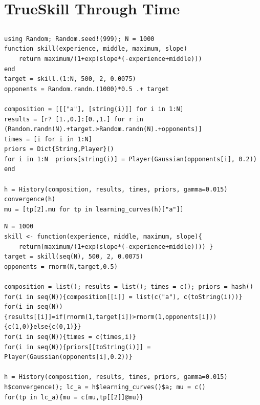 \documentclass[a4paper,11pt]{book}
\theoremstyle{definition}
\newif\ifen
\newif\ifes
\newcommand{\en}[1]{\ifen#1\fi}
\newcommand{\es}[1]{\ifes#1\fi}
\begin{document}
\section{TrueSkill Through Time}

\subsection{\en{Skill evolution}}\label{sec:appendix_skill_evolution}

\en{We attach the \texttt{Julia} and \texttt{R} codes that solve the example presented in the section \ref{sec:skill_evolution} about estimation the skill evolution of a new player. }%
\es{Adjuntamos los códigos de \texttt{Julia} y \texttt{R} que resuelven el ejemplo presentado en la sección \ref{sec:skill_evolution} sobre la evolución de habilidad de un jugador nuevo. }%
%
\begin{lstlisting}[backgroundcolor=\color{julia!60},caption={\en{\texttt{Julia} code}\es{Código \texttt{Julia}}},aboveskip=0.0 \baselineskip, belowskip=0.1cm]
using Random; Random.seed!(999); N = 1000
function skill(experience, middle, maximum, slope)
    return maximum/(1+exp(slope*(-experience+middle)))
end
target = skill.(1:N, 500, 2, 0.0075)
opponents = Random.randn.(1000)*0.5 .+ target

composition = [[["a"], [string(i)]] for i in 1:N]
results = [r? [1.,0.]:[0.,1.] for r in (Random.randn(N).+target.>Random.randn(N).+opponents)]
times = [i for i in 1:N]
priors = Dict{String,Player}()
for i in 1:N  priors[string(i)] = Player(Gaussian(opponents[i], 0.2))  end

h = History(composition, results, times, priors, gamma=0.015)
convergence(h)
mu = [tp[2].mu for tp in learning_curves(h)["a"]]
\end{lstlisting}
%
\begin{lstlisting}[backgroundcolor=\color{r!50},caption={\en{\texttt{R} code}\es{Código \texttt{R}}},aboveskip=0.0 \baselineskip, belowskip=0.1cm]
N = 1000
skill <- function(experience, middle, maximum, slope){
    return(maximum/(1+exp(slope*(-experience+middle)))) }
target = skill(seq(N), 500, 2, 0.0075)
opponents = rnorm(N,target,0.5)

composition = list(); results = list(); times = c(); priors = hash()
for(i in seq(N)){composition[[i]] = list(c("a"), c(toString(i)))}
for(i in seq(N)){results[[i]]=if(rnorm(1,target[i])>rnorm(1,opponents[i])){c(1,0)}else{c(0,1)}}
for(i in seq(N)){times = c(times,i)}
for(i in seq(N)){priors[[toString(i)]] = Player(Gaussian(opponents[i],0.2))}

h = History(composition, results, times, priors, gamma=0.015)
h$convergence(); lc_a = h$learning_curves()$a; mu = c()
for(tp in lc_a){mu = c(mu,tp[[2]]@mu)}
\end{lstlisting}
\end{document}
